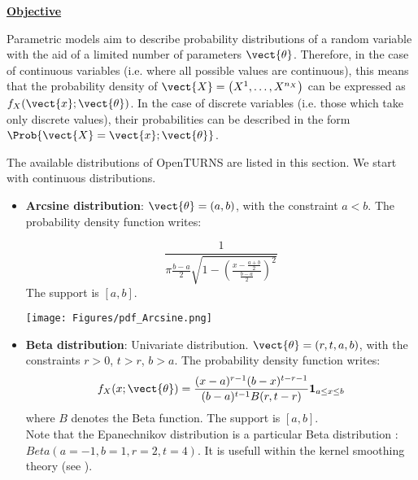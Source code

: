 

\renewcommand{\etapemethodo}{B}
\renewcommand{\nomfichier}{docref_B121_DistributionSelection}
\renewcommand{\titrefiche}{Standard parametric models}

\Header

\MathematicalDescription
{

\underline{\textbf{Objective}} \vspace{2mm}

Parametric models aim to describe probability distributions of a random variable with the aid of a limited number of parameters $\vect{\theta}$. Therefore, in the case of continuous variables (i.e. where all possible values are continuous), this means that the probability density of $\vect{X} = \left( X^1,\ldots,X^{n_X} \right)$ can be expressed as $f_X(\vect{x};\vect{\theta})$. In the case of discrete variables (i.e. those which take only discrete values), their probabilities can be described in the form $\Prob{\vect{X} = \vect{x};\vect{\theta}}$.
\vspace{2mm}

The available distributions of OpenTURNS are listed in this section. We start with continuous distributions.

\begin{itemize}
\item {\bf Arcsine distribution}: $\vect{\theta} = \left(a,b \right)$, with the constraint $a<b$. The probability density function writes:

\begin{equation}
\frac{ 1 }{ \pi\frac{b-a}{2} \sqrt{1-\left(\frac{
x-\frac{a+b}{2} }{\frac{b-a}{2} }\right)^{2}} }
\end{equation}
The support is $[a,b]$.

\begin{center}
\texttt{[image: Figures/pdf\_Arcsine.png]}
\end{center}

\item {\bf Beta distribution}: Univariate distribution. $\vect{\theta} = \left( r,t,a,b \right)$, with the constraints $r>0$, $t>r$, $b>a$. The probability density function writes:
\begin{equation}
f_X(x;\vect{\theta}) = \frac{(x-a)^{r-1} (b-x)^{t-r-1}}{(b-a)^{t-1} B(r,t-r)} \mathbf{1}_{a \leq x \leq b}
\end{equation}
where $B$ denotes the Beta function. The support is $[a,b]$.\\
Note that the Epanechnikov distribution is a particular Beta distribution : $Beta (a=-1, b=1, r=2, t=4)$. It is usefull within the kernel smoothing theory (see ).



\end{itemize}}
